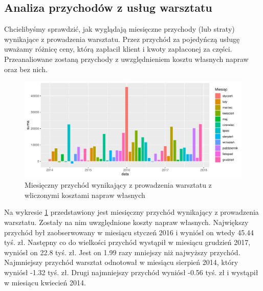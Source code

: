 \documentclass{article}\usepackage[]{graphicx}\usepackage[]{xcolor}
\makeatletter
\def\maxwidth{ %
  \ifdim\Gin@nat@width>\linewidth
    \linewidth
  \else
    \Gin@nat@width
  \fi
}
\newenvironment{knitrout}{}{} %
\makeatother
\begin{document}
\subsection{Analiza przychodów z usług warsztatu}

Chcielibyśmy sprawdzić, jak wyglądają miesięczne przychody (lub straty) wynikające z prowadzenia warsztatu. Przez przychód za pojedyńczą usługę uważamy różnicę ceny, którą zapłacił klient i kwoty zapłaconej za części. Przeanaliowane zostaną przychody z uwzględnieniem kosztu własnych napraw oraz bez nich.

\begin{knitrout}
\color{fgcolor}\begin{figure}[H]

{\centering \includegraphics[width=\maxwidth]{figure/fig_uslugi-1} 

}

\caption[Miesięczny przychód wynikający z prowadzenia warsztatu z wliczonymi kosztami napraw własnych]{Miesięczny przychód wynikający z prowadzenia warsztatu z wliczonymi kosztami napraw własnych}\label{fig:fig_uslugi}
\end{figure}

\end{knitrout}

Na wykresie \ref{fig:fig_uslugi} przedstawiony jest miesięczny przychód wynikający z prowadzenia warsztatu. Zostały na nim uwzględnione koszty napraw własnych. 
Największy przychód był zaobserwowany w miesiącu styczeń 2016 i wyniósł on wtedy 45.44 tyś. zł.
Następny co do wielkości przychód wystąpił w miesiącu grudzień 2017, wyniósł on 22.8 tyś. zł. Jest on 1.99 razy mniejszy niż najwyższy przychód.
Najmniejszy przychód warsztat odnotował w miesiącu sierpień 2014, który wyniósł -1.32 tyś. zł. 
Drugi najmniejszy przychód wyniósł -0.56 tyś. zł i wystąpił w miesiącu kwiecień 2014.
\end{document}
